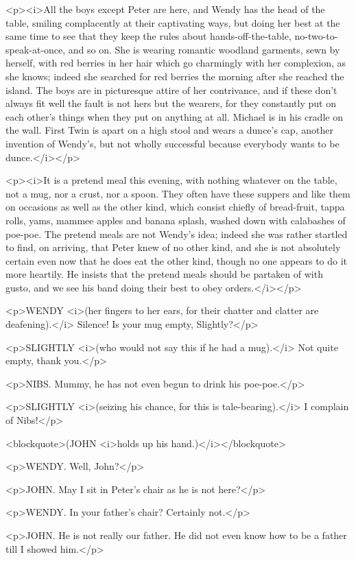 <p><i>All the boys except Peter are here, and Wendy has the head of
the table, smiling complacently at their captivating ways, but doing
her best at the same time to see that they keep the rules about
hands-off-the-table, no-two-to-speak-at-once, and so on. She is
wearing romantic woodland garments, sewn by herself, with red berries
in her hair which go charmingly with her complexion, as she knows;
indeed she searched for red berries the morning after she reached the
island. The boys are in picturesque attire of her contrivance, and if
these don't always fit well the fault is not hers but the wearers,
for they constantly put on each other's things when they put on
anything at all. Michael is in his cradle on the wall. First Twin is
apart on a high stool and wears a dunce's cap, another invention of
Wendy's, but not wholly successful because everybody wants to be
dunce.</i></p>

<p><i>It is a pretend meal this evening, with nothing whatever on the
table, not a mug, nor a crust, nor a spoon. They often have these
suppers and like them on occasions as well as the other kind, which
consist chiefly of bread-fruit, tappa rolls, yams, mammee apples and
banana splash, washed down with calabashes of poe-poe. The pretend
meals are not Wendy's idea; indeed she was rather startled to find,
on arriving, that Peter knew of no other kind, and she is not
absolutely certain even now that he does eat the other kind, though
no one appears to do it more heartily. He insists that the pretend
meals should be partaken of with gusto, and we see his band doing
their best to obey orders.</i></p>

<p>WENDY <i>(her fingers to her ears, for their chatter and clatter
are deafening).</i> Silence! Is your mug empty, Slightly?</p>

<p>SLIGHTLY <i>(who would not say this if he had a mug).</i> Not
quite empty, thank you.</p>

<p>NIBS. Mummy, he has not even begun to drink his poe-poe.</p>

<p>SLIGHTLY <i>(seizing his chance, for this is tale-bearing).</i> I
complain of Nibs!</p>

<blockquote>(JOHN <i>holds up his hand.)</i></blockquote>

<p>WENDY. Well, John?</p>

<p>JOHN. May I sit in Peter's chair as he is not here?</p>

<p>WENDY. In your father's chair? Certainly not.</p>

<p>JOHN. He is not really our father. He did not even know how to be
a father till I showed him.</p>

